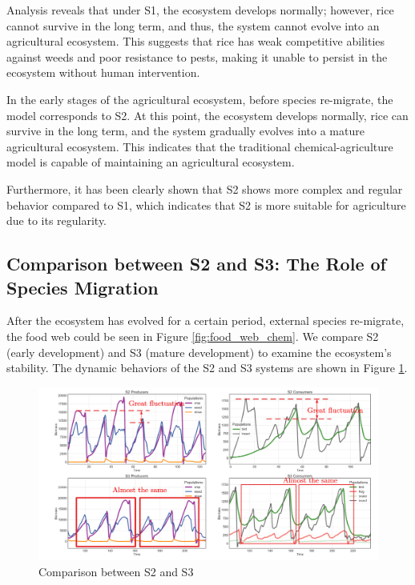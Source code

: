 \documentclass{HZNUMCM}
\begin{document}
      Analysis reveals that under S1, the ecosystem develops normally; 
      however, rice cannot survive in the long term, and thus, the system cannot evolve into an agricultural ecosystem. 
      This suggests that rice has weak competitive abilities against weeds and poor resistance to pests, 
      making it unable to persist in the ecosystem without human intervention.
      
      In the early stages of the agricultural ecosystem, before species re-migrate, 
      the model corresponds to S2. At this point, the ecosystem develops normally, 
      rice can survive in the long term, and the system gradually evolves into a mature agricultural ecosystem. 
      This indicates that the traditional chemical-agriculture model is capable of maintaining an agricultural ecosystem. 
      
      Furthermore, it has been clearly shown that S2 shows more complex and regular behavior compared to S1, 
      which indicates that S2 is more suitable for agriculture due to its regularity.
      
      \subsection{Comparison between S2 and S3: The Role of Species Migration}
        After the ecosystem has evolved for a certain period, external species re-migrate, the food web could be seen in Figure \ref{fig:food_web_chem}. 
        We compare S2 (early development) and S3 (mature development) to examine the ecosystem's stability.
        The dynamic behaviors of the S2 and S3 systems are shown in Figure \ref{fig:S2S3}.
        \begin{figure}
          \centering
          \includegraphics[width=\linewidth]{images/S2S3.png}
          \caption{Comparison between S2 and S3}
          \label{fig:S2S3}
        \end{figure}
\end{document}
